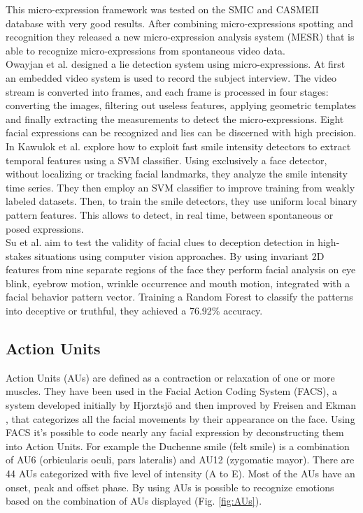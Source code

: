 This micro-expression framework was tested on the SMIC and CASMEII database with very good results. After combining micro-expressions spotting and recognition they released a new micro-expression analysis system (MESR) that is able to recognize micro-expressions from spontaneous video data. \\
Owayjan et al. \cite{6462897} designed a lie detection system using micro-expressions. At first an embedded video system is used to record the subject interview. The video stream is converted into frames, and each frame is processed in four stages: converting the images, filtering out useless features, applying geometric templates and finally extracting the measurements to detect the micro-expressions. Eight facial expressions can be recognized and lies can be discerned with high precision. \\
In \cite{10.1007/978-3-319-47955-2_27} Kawulok et al. explore how to exploit fast smile intensity detectors to extract temporal features using a SVM classifier. Using exclusively a face detector, without localizing or tracking facial landmarks, they analyze the smile intensity time series. They then employ an SVM classifier to improve training from weakly labeled datasets. Then, to train the smile detectors, they use uniform local binary pattern features. This allows to detect, in real time, between spontaneous or posed expressions. \\
Su et al. \cite{SU201652} aim to test the validity of facial clues to deception detection in high-stakes situations using computer vision approaches. By using invariant 2D features from nine separate regions of the face they perform facial analysis on eye blink, eyebrow motion, wrinkle occurrence and mouth motion, integrated with a facial behavior pattern vector. Training a Random Forest to classify the patterns into deceptive or truthful, they achieved a 76.92\% accuracy. \\

\subsection{Action Units} \label{au}
Action Units (AUs) are defined as a contraction or relaxation of one or more muscles. They have been used in the Facial Action Coding System (FACS), a system developed initially by Hjorztsjö \cite{facsCH} and then improved by Freisen and Ekman \cite{facs1978}, that categorizes all the facial movements by their appearance on the face. Using FACS it's possible to code nearly any facial expression by deconstructing them into Action Units. For example the Duchenne smile (felt smile) is a combination of AU6 (orbicularis oculi, pars lateralis) and AU12 (zygomatic mayor).
There are 44 AUs categorized with five level of intensity (A to E). Most of the AUs have an onset, peak and offset phase.
By using AUs is possible to recognize emotions based on the combination of AUs displayed (Fig. \ref{fig:AUs}).\\

